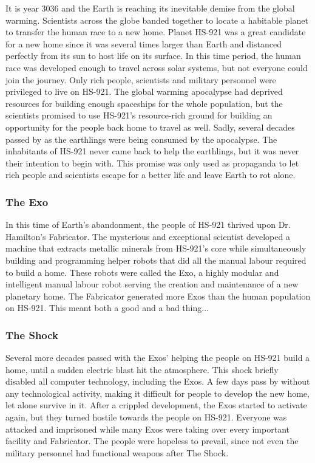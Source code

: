 \documentclass[12pt]{article}
\begin{document}
It is year 3036 and the Earth is reaching its inevitable demise from the global warming. Scientists across the globe banded together to locate a habitable planet to transfer the human race to a new home. Planet HS-921 was a great candidate for a new home since it was several times larger than Earth and distanced perfectly from its sun to host life on its surface. In this time period, the human race was  developed enough to travel across solar systems, but not everyone could join the journey. Only rich people, scientists and military personnel were privileged to live on HS-921. The global warming apocalypse had deprived resources for building enough spaceships for the whole population, but the scientists promised to use HS-921's resource-rich ground for building an opportunity for the people back home to travel as well. Sadly, several decades passed by as the earthlings were being consumed by the apocalypse. The inhabitants of HS-921 never came back to help the earthlings, but it was never their intention to begin with. This promise was only used as propaganda to let rich people and scientists escape for a better life and leave Earth to rot alone. 

\subsubsection{The Exo}

In this time of Earth's abandonment, the people of HS-921 thrived upon Dr. Hamilton's Fabricator. The mysterious and exceptional scientist developed a machine that extracts metallic minerals from HS-921's core while simultaneously building and programming helper robots that did all the manual labour required to build a home. These robots were called the Exo, a highly modular and intelligent manual labour robot serving the creation and maintenance of a new planetary home. The Fabricator generated more Exos than the human population on HS-921. This meant both a good and a bad thing...

\subsubsection{The Shock}

Several more decades passed with the Exos' helping the people on HS-921 build a home, until a sudden electric blast hit the atmosphere. This shock briefly disabled all computer technology, including the Exos. A few days pass by without any technological activity, making it difficult for people to develop the new home, let alone survive in it. After a crippled development, the Exos started to activate again, but they turned hostile towards the people on HS-921. Everyone was attacked and imprisoned while many Exos were taking over every important facility and Fabricator. The people were hopeless to prevail, since not even the military personnel had functional weapons after The Shock. 
\end{document}
